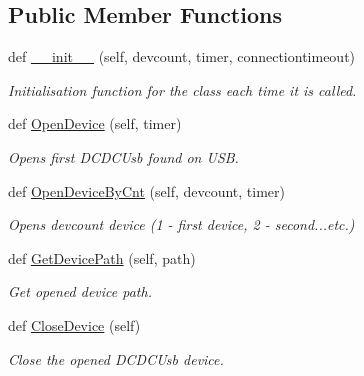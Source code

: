 \subsection*{Public Member Functions}
\begin{DoxyCompactItemize}
\item 
def \hyperlink{class_mini_box_d_c_d_c_1_1_dc_dc_converter_1_1_dc_dc_converter_ae7aaa0ca9b46f3eecc28e3cd35d04eef}{\+\_\+\+\_\+init\+\_\+\+\_\+} (self, devcount, timer, connectiontimeout)
\begin{DoxyCompactList}\small\item\em Initialisation function for the class each time it is called. \end{DoxyCompactList}\item 
def \hyperlink{class_mini_box_d_c_d_c_1_1_dc_dc_converter_1_1_dc_dc_converter_a48fc2f6d39793c6e08b1199977f430c2}{Open\+Device} (self, timer)
\begin{DoxyCompactList}\small\item\em Opens first D\+C\+D\+C\+Usb found on U\+SB. \end{DoxyCompactList}\item 
def \hyperlink{class_mini_box_d_c_d_c_1_1_dc_dc_converter_1_1_dc_dc_converter_aa2b930875b9c91cbbe295827feb75ce6}{Open\+Device\+By\+Cnt} (self, devcount, timer)
\begin{DoxyCompactList}\small\item\em Opens devcount device (1 -\/ first device, 2 -\/ second...etc.) \end{DoxyCompactList}\item 
def \hyperlink{class_mini_box_d_c_d_c_1_1_dc_dc_converter_1_1_dc_dc_converter_a3aef4563d83abf54edc0fa5f5eaa4f62}{Get\+Device\+Path} (self, path)
\begin{DoxyCompactList}\small\item\em Get opened device path. \end{DoxyCompactList}\item 
\mbox{\label{class_mini_box_d_c_d_c_1_1_dc_dc_converter_1_1_dc_dc_converter_a9df758198a899274cd22a4900448d1dd}} 
def \hyperlink{class_mini_box_d_c_d_c_1_1_dc_dc_converter_1_1_dc_dc_converter_a9df758198a899274cd22a4900448d1dd}{Close\+Device} (self)
\begin{DoxyCompactList}\small\item\em Close the opened D\+C\+D\+C\+Usb device. \end{DoxyCompactList}\item 

\end{DoxyCompactItemize}
